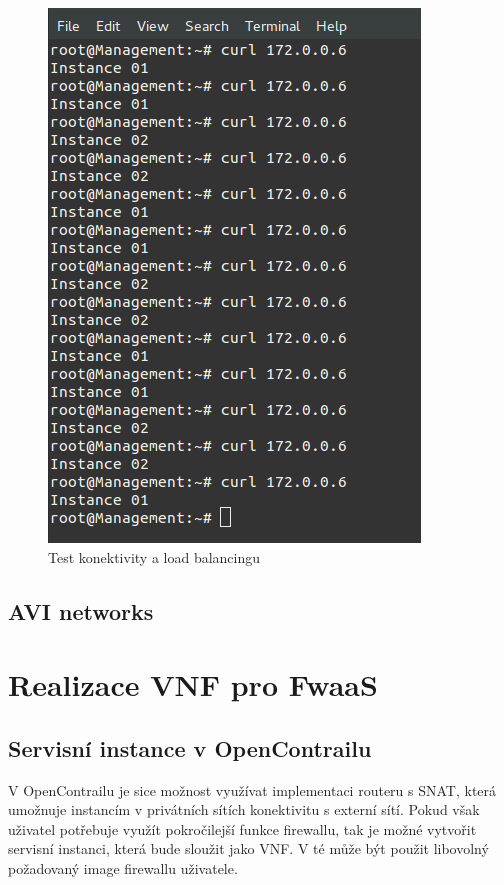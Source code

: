 \begin{figure}[h]
\begin{centering}
\includegraphics[scale=0.3]{images/lbaas_testing}
\par\end{centering}
\caption{Test konektivity a load balancingu\label{fig:lbaas_testing}}
\end{figure}


\subsection{AVI networks}




\section{Realizace VNF pro FwaaS}

\subsection{Servisní instance v OpenContrailu}

V OpenContrailu je sice možnost využívat implementaci routeru s SNAT, která umožnuje instancím v privátních sítích konektivitu s externí sítí. Pokud však uživatel potřebuje využít pokročilejší funkce firewallu, tak je možné vytvořit servisní instanci, která bude sloužit jako VNF. V té může být použit libovolný požadovaný image firewallu uživatele.

